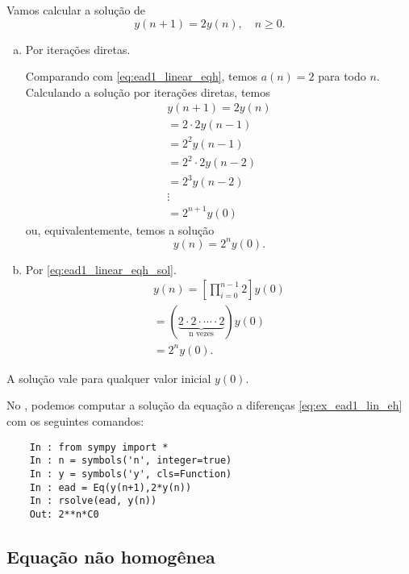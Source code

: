 \begin{ex}
  Vamos calcular a solução de
  \begin{equation}\label{eq:ex_ead1_lin_eh}
    y(n+1) = 2y(n),\quad n\geq 0.
  \end{equation}

  \begin{enumerate}[a)]
  \item Por iterações diretas.

    Comparando com \eqref{eq:ead1_linear_eqh}, temos $a(n) = 2$ para todo $n$. Calculando a solução por iterações diretas, temos
    \begin{gather}
      y(n+1) = 2y(n) \\
      = 2\cdot 2y(n-1) \\
      = 2^2y(n-1) \\
      = 2^2\cdot 2y(n-2) \\
      = 2^3y(n-2) \\
      \vdots \nonumber\\
      = 2^{n+1}y(0)
    \end{gather}
    ou, equivalentemente, temos a solução
    \begin{equation}
      y(n) = 2^ny(0).
    \end{equation}

  \item Por \eqref{eq:ead1_linear_eqh_sol}.
    \begin{gather}
      y(n) = \left[\prod_{i=0}^{n-1}2\right]y(0) \\
      = (\underbrace{2\cdot 2\cdot \cdots \cdot 2}_{\text{n vezes}}) y(0)\\
      = 2^{n}y(0).
    \end{gather}
  \end{enumerate}
  A solução vale para qualquer valor inicial $y(0)$.

  \ifispython
  No \python, podemos computar a solução da equação a diferenças \eqref{eq:ex_ead1_lin_eh} com os seguintes comandos:
  \begin{lstlisting}
    In : from sympy import *
    In : n = symbols('n', integer=true)
    In : y = symbols('y', cls=Function)
    In : ead = Eq(y(n+1),2*y(n))
    In : rsolve(ead, y(n))
    Out: 2**n*C0
  \end{lstlisting}
  \fi
\end{ex}

\subsection{Equação não homogênea}

